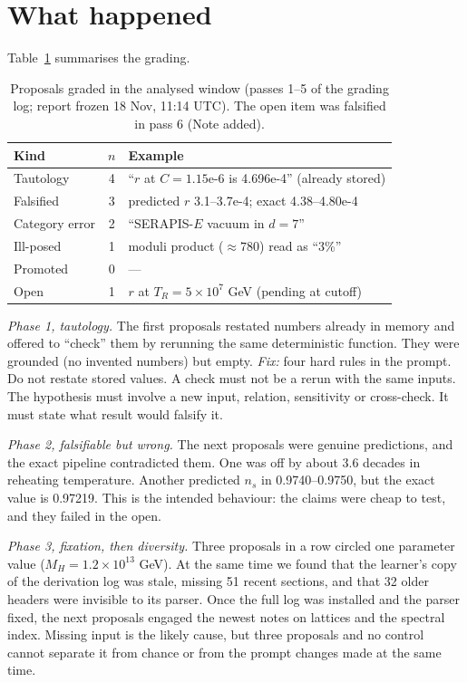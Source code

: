 \documentclass[aps,prd,twocolumn,superscriptaddress,nofootinbib,showkeys]{revtex4-2}
\begin{document}
\section{What happened}
Table~\ref{tab:g} summarises the grading.

\begin{table}[t]
\caption{Proposals graded in the analysed window (passes 1--5 of the grading log; report frozen 18 Nov, 11:14 UTC). The open item was falsified in pass 6 (Note added).}
\label{tab:g}
\begin{ruledtabular}\footnotesize
\begin{tabular}{lcl}
Kind & $n$ & Example\\ \hline
Tautology & 4 & ``$r$ at $C=1.15$e-6 is 4.696e-4'' (already stored)\\
Falsified & 3 & predicted $r$ 3.1--3.7e-4; exact 4.38--4.80e-4\\
Category error & 2 & ``SERAPIS-$E$ vacuum in $d=7$''\\
Ill-posed & 1 & moduli product ($\approx780$) read as ``3\%''\\
Promoted & 0 & ---\\
Open & 1 & $r$ at $T_R=5\times10^7$ GeV (pending at cutoff)
\end{tabular}
\end{ruledtabular}
\end{table}

\emph{Phase 1, tautology.} The first proposals restated numbers already in memory and offered to ``check'' them by rerunning the same deterministic function. They were grounded (no invented numbers) but empty. \emph{Fix:} four hard rules in the prompt. Do not restate stored values. A check must not be a rerun with the same inputs. The hypothesis must involve a new input, relation, sensitivity or cross-check. It must state what result would falsify it.

\emph{Phase 2, falsifiable but wrong.} The next proposals were genuine predictions, and the exact pipeline contradicted them. One was off by about 3.6 decades in reheating temperature. Another predicted $n_s$ in 0.9740--0.9750, but the exact value is 0.97219. This is the intended behaviour: the claims were cheap to test, and they failed in the open.

\emph{Phase 3, fixation, then diversity.} Three proposals in a row circled one parameter value ($M_H=1.2\times10^{13}$ GeV). At the same time we found that the learner's copy of the derivation log was stale, missing 51 recent sections, and that 32 older headers were invisible to its parser. Once the full log was installed and the parser fixed, the next proposals engaged the newest notes on lattices and the spectral index. Missing input is the likely cause, but three proposals and no control cannot separate it from chance or from the prompt changes made at the same time.
\end{document}
